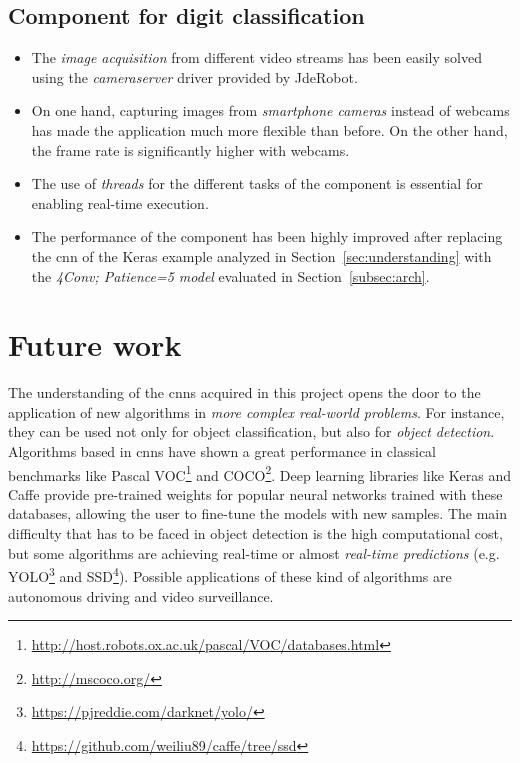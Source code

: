\subsection*{Component for digit classification}
\begin{itemize}
	\item The \emph{image acquisition} from different video streams has been easily solved using the \textit{cameraserver} driver provided by JdeRobot.
	\item On one hand, capturing images from \emph{smartphone cameras} instead of webcams has made the application much more flexible than before. On the other hand, the frame rate is significantly higher with webcams.
	\item The use of \emph{threads} for the different tasks of the component is essential for enabling real-time execution.
	\item The performance of the component has been highly improved after replacing the \gls{cnn} of the Keras example analyzed in Section~\ref{sec:understanding} with the \emph{\textit{4Conv; Patience=5} model} evaluated in Section~\ref{subsec:arch}.
\end{itemize}

\section{Future work}
The understanding of the \glspl{cnn} acquired in this project opens the door to the application of new algorithms in \emph{more complex real-world problems}. For instance, they can be used not only for object classification, but also for \emph{object detection}. Algorithms based in \glspl{cnn} have shown a great performance in classical benchmarks like Pascal VOC\footnote{\url{http://host.robots.ox.ac.uk/pascal/VOC/databases.html}} and COCO\footnote{\url{http://mscoco.org/}}. Deep learning libraries like Keras and Caffe provide pre-trained weights for popular neural networks trained with these databases, allowing the user to fine-tune the models with new samples. The main difficulty that has to be faced in object detection is the high computational cost, but some algorithms are achieving real-time or almost \emph{real-time predictions} (e.g. YOLO\footnote{\url{https://pjreddie.com/darknet/yolo/}} and SSD\footnote{\url{https://github.com/weiliu89/caffe/tree/ssd}}). Possible applications of these kind of algorithms are autonomous driving and video surveillance.